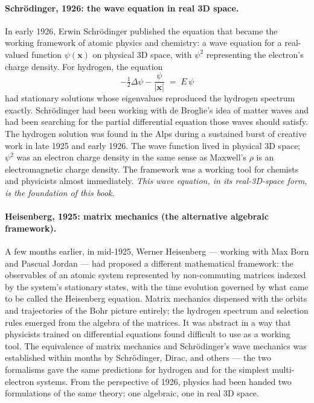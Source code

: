 \paragraph{Schr\"odinger, 1926: the wave equation in real 3D space.}
In early 1926, Erwin Schr\"odinger published the equation that became the working framework of atomic physics and chemistry: a wave equation for a real-valued function $\psi(\mathbf{x})$ on physical 3D space, with $\psi^2$ representing the electron's charge density. For hydrogen, the equation
\[
-\tfrac{1}{2}\Delta \psi - \frac{\psi}{|\mathbf{x}|} \;=\; E\, \psi
\]
had stationary solutions whose eigenvalues reproduced the hydrogen spectrum exactly. Schr\"odinger had been working with de Broglie's idea of matter waves and had been searching for the partial differential equation those waves should satisfy. The hydrogen solution was found in the Alps during a sustained burst of creative work in late 1925 and early 1926. The wave function lived in physical 3D space; $\psi^2$ was an electron charge density in the same sense as Maxwell's $\rho$ is an electromagnetic charge density. The framework was a working tool for chemists and physicists almost immediately. \emph{This wave equation, in its real-3D-space form, is the foundation of this book.}

\paragraph{Heisenberg, 1925: matrix mechanics (the alternative algebraic framework).}
A few months earlier, in mid-1925, Werner Heisenberg --- working with Max Born and Pascual Jordan --- had proposed a different mathematical framework: the observables of an atomic system represented by non-commuting matrices indexed by the system's stationary states, with the time evolution governed by what came to be called the Heisenberg equation. Matrix mechanics dispensed with the orbits and trajectories of the Bohr picture entirely; the hydrogen spectrum and selection rules emerged from the algebra of the matrices. It was abstract in a way that physicists trained on differential equations found difficult to use as a working tool. The equivalence of matrix mechanics and Schr\"odinger's wave mechanics was established within months by Schr\"odinger, Dirac, and others --- the two formalisms gave the same predictions for hydrogen and for the simplest multi-electron systems. From the perspective of 1926, physics had been handed two formulations of the same theory: one algebraic, one in real 3D space.

